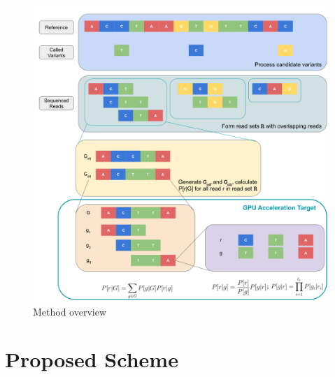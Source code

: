 \documentclass{PHlab-thesis}
\begin{document}
\begin{figure}
	\centering
	\includegraphics[scale=0.3]{figures/overview.png}
	\caption{Method overview}
	\label{fig:overview} %
\end{figure}

\section{Proposed Scheme}
\end{document}
